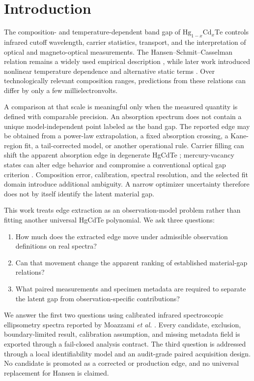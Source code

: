 \section{Introduction}
\label{sec:introduction}

The composition- and temperature-dependent band gap of $\mathrm{Hg}_{1-x}\mathrm{Cd}_{x}\mathrm{Te}$ controls infrared cutoff wavelength, carrier statistics, transport, and the interpretation of optical and magneto-optical measurements. The Hansen--Schmit--Casselman relation remains a widely used empirical description \cite{Hansen1982}, while later work introduced nonlinear temperature dependence and alternative static terms \cite{Seiler1990,Laurenti1990}. Over technologically relevant composition ranges, predictions from these relations can differ by only a few millielectronvolts.

A comparison at that scale is meaningful only when the measured quantity is defined with comparable precision. An absorption spectrum does not contain a unique model-independent point labeled as the band gap. The reported edge may be obtained from a power-law extrapolation, a fixed absorption crossing, a Kane-region fit, a tail-corrected model, or another operational rule. Carrier filling can shift the apparent absorption edge in degenerate HgCdTe \cite{Sarusi1989}; mercury-vacancy states can alter edge behavior and compromise a conventional optical gap criterion \cite{Yue2006}. Composition error, calibration, spectral resolution, and the selected fit domain introduce additional ambiguity. A narrow optimizer uncertainty therefore does not by itself identify the latent material gap.

This work treats edge extraction as an observation-model problem rather than fitting another universal HgCdTe polynomial. We ask three questions:
\begin{enumerate}
  \item How much does the extracted edge move under admissible observation definitions on real spectra?
  \item Can that movement change the apparent ranking of established material-gap relations?
  \item What paired measurements and specimen metadata are required to separate the latent gap from observation-specific contributions?
\end{enumerate}

We answer the first two questions using calibrated infrared spectroscopic ellipsometry spectra reported by Moazzami \emph{et al.} \cite{Moazzami2005}. Every candidate, exclusion, boundary-limited result, calibration assumption, and missing metadata field is exported through a fail-closed analysis contract. The third question is addressed through a local identifiability model and an audit-grade paired acquisition design. No candidate is promoted as a corrected or production edge, and no universal replacement for Hansen is claimed.
